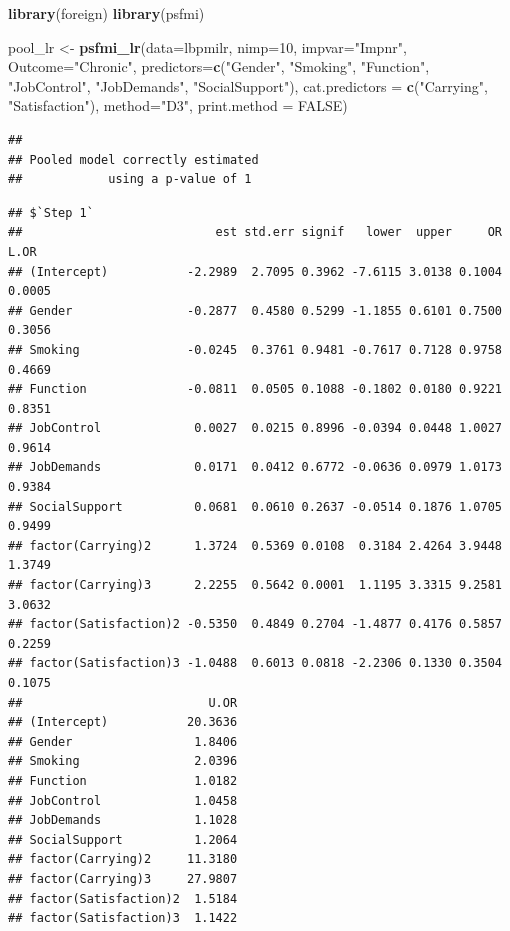 \documentclass[
]{book}
\newenvironment{Shaded}{\begin{snugshade}}{\end{snugshade}}
\newcommand{\DataTypeTok}[1]{\textcolor[rgb]{0.13,0.29,0.53}{#1}}
\newcommand{\DecValTok}[1]{\textcolor[rgb]{0.00,0.00,0.81}{#1}}
\newcommand{\KeywordTok}[1]{\textcolor[rgb]{0.13,0.29,0.53}{\textbf{#1}}}
\newcommand{\NormalTok}[1]{#1}
\newcommand{\OperatorTok}[1]{\textcolor[rgb]{0.81,0.36,0.00}{\textbf{#1}}}
\newcommand{\OtherTok}[1]{\textcolor[rgb]{0.56,0.35,0.01}{#1}}
\newcommand{\StringTok}[1]{\textcolor[rgb]{0.31,0.60,0.02}{#1}}
\begin{document}
\begin{Shaded}
\begin{Highlighting}[]
\KeywordTok{library}\NormalTok{(foreign)}
\KeywordTok{library}\NormalTok{(psfmi)}

\NormalTok{pool_lr <-}\StringTok{ }\KeywordTok{psfmi_lr}\NormalTok{(}\DataTypeTok{data=}\NormalTok{lbpmilr, }\DataTypeTok{nimp=}\DecValTok{10}\NormalTok{, }\DataTypeTok{impvar=}\StringTok{"Impnr"}\NormalTok{, }\DataTypeTok{Outcome=}\StringTok{"Chronic"}\NormalTok{,}
  \DataTypeTok{predictors=}\KeywordTok{c}\NormalTok{(}\StringTok{"Gender"}\NormalTok{, }\StringTok{"Smoking"}\NormalTok{, }\StringTok{"Function"}\NormalTok{, }\StringTok{"JobControl"}\NormalTok{, }\StringTok{"JobDemands"}\NormalTok{,}
  \StringTok{"SocialSupport"}\NormalTok{), }\DataTypeTok{cat.predictors =} \KeywordTok{c}\NormalTok{(}\StringTok{"Carrying"}\NormalTok{, }\StringTok{"Satisfaction"}\NormalTok{), }
  \DataTypeTok{method=}\StringTok{"D3"}\NormalTok{, }\DataTypeTok{print.method =} \OtherTok{FALSE}\NormalTok{)}
\end{Highlighting}
\end{Shaded}

\begin{verbatim}
## 
## Pooled model correctly estimated
##            using a p-value of 1
\end{verbatim}

\begin{Shaded}
\end{Shaded}

\begin{verbatim}
## $`Step 1`
##                           est std.err signif   lower  upper     OR   L.OR
## (Intercept)           -2.2989  2.7095 0.3962 -7.6115 3.0138 0.1004 0.0005
## Gender                -0.2877  0.4580 0.5299 -1.1855 0.6101 0.7500 0.3056
## Smoking               -0.0245  0.3761 0.9481 -0.7617 0.7128 0.9758 0.4669
## Function              -0.0811  0.0505 0.1088 -0.1802 0.0180 0.9221 0.8351
## JobControl             0.0027  0.0215 0.8996 -0.0394 0.0448 1.0027 0.9614
## JobDemands             0.0171  0.0412 0.6772 -0.0636 0.0979 1.0173 0.9384
## SocialSupport          0.0681  0.0610 0.2637 -0.0514 0.1876 1.0705 0.9499
## factor(Carrying)2      1.3724  0.5369 0.0108  0.3184 2.4264 3.9448 1.3749
## factor(Carrying)3      2.2255  0.5642 0.0001  1.1195 3.3315 9.2581 3.0632
## factor(Satisfaction)2 -0.5350  0.4849 0.2704 -1.4877 0.4176 0.5857 0.2259
## factor(Satisfaction)3 -1.0488  0.6013 0.0818 -2.2306 0.1330 0.3504 0.1075
##                          U.OR
## (Intercept)           20.3636
## Gender                 1.8406
## Smoking                2.0396
## Function               1.0182
## JobControl             1.0458
## JobDemands             1.1028
## SocialSupport          1.2064
## factor(Carrying)2     11.3180
## factor(Carrying)3     27.9807
## factor(Satisfaction)2  1.5184
## factor(Satisfaction)3  1.1422
\end{verbatim}
\end{document}
